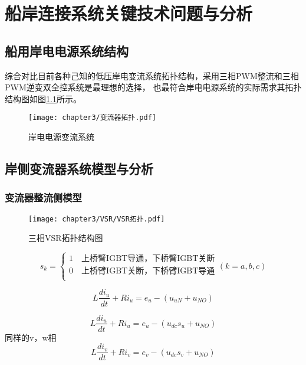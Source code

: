 \chapter{船岸连接系统关键技术问题与分析}

\section{船用岸电电源系统结构}

综合对比目前各种己知的低压岸电变流系统拓扑结构，采用三相PWM整流和三相PWM逆变双全控系统是最理想的选择，
也最符合岸电电源系统的实际需求其拓扑结构图如图\ref{fig:岸电电源变流系统}所示。

\begin{figure}[!htp]
	\centering
	\texttt{[image: chapter3/变流器拓扑.pdf]}
	\caption{岸电电源变流系统}
	\label{fig:岸电电源变流系统}
\end{figure}

\section{岸侧变流器系统模型与分析}

\subsection{变流器整流侧模型}

\begin{figure}[!htp]
	\centering
	\texttt{[image: chapter3/VSR/VSR拓扑.pdf]}
	\caption{三相VSR拓扑结构图}
	\label{fig:三相VSR拓扑结构图}
\end{figure}

\begin{equation}
	s_{k} =
	\begin{cases}
		1 \quad \text{上桥臂IGBT导通，下桥臂IGBT关断} \\
		0 \quad \text{上桥臂IGBT关断，下桥臂IGBT导通} \\
	\end{cases}
	(k=a,b,c)
	\label{equ:Sk}
\end{equation}

\begin{equation}
	L\frac{di_{u}}{dt}+Ri_{u}=e_{u}-(u_{uN}+u_{NO})
	\label{equ:3-3}
\end{equation}

\begin{equation}
	L\frac{di_{u}}{dt}+Ri_{u}=e_{u}-(u_{dc}s_{u}+u_{NO})
\end{equation}
同样的v，w相
\begin{equation}
	L\frac{di_{v}}{dt}+Ri_{v}=e_{v}-(u_{dc}s_{v}+u_{NO})
	\label{equ:3-4}
\end{equation}

